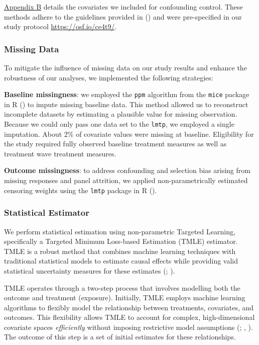 \documentclass[
  single column]{article}
\begin{document}
\hyperref[appendix-demographics]{Appendix B} details the covariates we
included for confounding control. These methods adhere to the guidelines
provided in () and
were pre-specified in our study protocol \url{https://osf.io/ce4t9/}.

\subsubsection{Missing Data}\label{missing-data}

To mitigate the influence of missing data on our study results and
enhance the robustness of our analyses, we implemented the following
strategies:

\textbf{Baseline missingness}: we employed the \texttt{ppm} algorithm
from the \texttt{mice} package in R () to impute missing baseline data. This method allowed us to
reconstruct incomplete datasets by estimating a plausible value for
missing observation. Because we could only pass one data set to the
\texttt{lmtp}, we employed a single imputation. About 2\% of covariate
values were missing at baseline. Eligibility for the study required
fully observed baseline treatment measures as well as treatment wave
treatment measures.

\textbf{Outcome missingness}: to address confounding and selection bias
arising from missing responses and panel attrition, we applied
non-parametrically estimated censoring weights using the \texttt{lmtp}
package in R ().

\subsubsection{Statistical Estimator}\label{statistical-estimator}

We perform statistical estimation using non-parametric Targeted
Learning, specifically a Targeted Minimum Loss-based Estimation (TMLE)
estimator. TMLE is a robust method that combines machine learning
techniques with traditional statistical models to estimate causal
effects while providing valid statistical uncertainty measures for these
estimates (;
).

TMLE operates through a two-step process that involves modelling both
the outcome and treatment (exposure). Initially, TMLE employs machine
learning algorithms to flexibly model the relationship between
treatments, covariates, and outcomes. This flexibility allows TMLE to
account for complex, high-dimensional covariate spaces
\emph{efficiently} without imposing restrictive model assumptions
(;
,
). The outcome of this step is a set
of initial estimates for these relationships.
\end{document}

